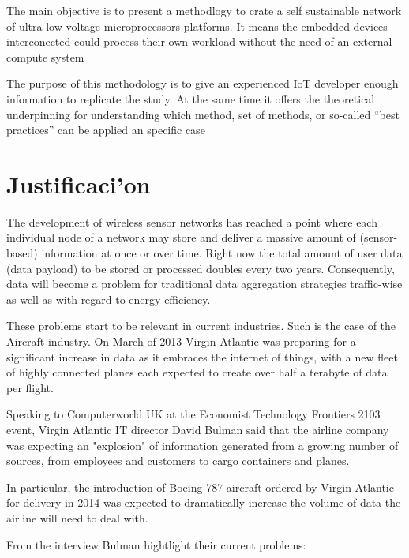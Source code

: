 The main objective is to present a methodlogy to crate a self sustainable
network of ultra-low-voltage microprocessors platforms. It means the embedded 
devices interconected could process their own workload without the need of an 
external compute system

The purpose of this methodology is to give an experienced IoT  developer 
enough information to replicate the study. At the same time it offers the theoretical 
underpinning for understanding which method, set of methods, or so-called “best 
practices” can be applied an specific case


\section{Justificaci'on}
\noindent

The development of wireless sensor networks has reached a point where each 
individual node of a network may store and deliver a massive amount of 
(sensor-based) information at once or over time. Right now the total amount of 
user data (data payload) to be stored or processed doubles every two years. Consequently,
data will become a problem for traditional data aggregation strategies 
traffic-wise as well as with regard to energy efficiency. 

These problems start to be relevant in current industries. Such is the case of 
the Aircraft industry. On March of 2013 Virgin Atlantic was preparing for a 
significant increase in data as it embraces the internet of things, with a new fleet of highly 
connected planes each expected to create over half a terabyte of data per flight.

Speaking to Computerworld UK at the Economist Technology Frontiers 2103 event, Virgin 
Atlantic IT director David Bulman said that the airline company was expecting an 
"explosion" of information generated from a growing number of sources, from 
employees and customers to cargo containers and planes.

In particular, the introduction of Boeing 787 aircraft ordered by Virgin 
Atlantic for delivery in 2014  was expected to dramatically increase the volume 
of data the airline will need to deal with.

From the interview Bulman hightlight their current problems: 


